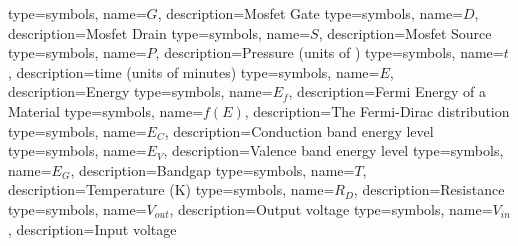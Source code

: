 {
    type=symbols,
    name={\ensuremath{G}},
    description={Mosfet Gate}
}
{
    type=symbols,
    name={\ensuremath{D}},
    description={Mosfet Drain}
}
{
    type=symbols,
    name={\ensuremath{S}},
    description={Mosfet Source}
}
{
    type=symbols,
    name={\ensuremath{P}},
    description={Pressure (units of \si{\torr})}
}
{
    type=symbols,
    name={\ensuremath{t}},
    description={time (units of minutes)}
}
{
    type=symbols,
    name={\ensuremath{E}},
    description={Energy}
}
{
    type=symbols,
    name={\ensuremath{E_{f}}},
    description={Fermi Energy of a Material}
}
{
    type=symbols,
    name={\ensuremath{f(E)}},
    description={The Fermi-Dirac distribution}
}
{
    type=symbols,
    name={\ensuremath{E_{C}}},
    description={Conduction band energy level}
}
{
    type=symbols,
    name={\ensuremath{E_{V}}},
    description={Valence band energy level}
}
{
    type=symbols,
    name={\ensuremath{E_{G}}},
    description={Bandgap}
}
{
    type=symbols,
    name={\ensuremath{T}},
    description={Temperature (\si{\kelvin})}
}
{
    type=symbols,
    name={\ensuremath{R_{D}}},
    description={Resistance}
}
{
    type=symbols,
    name={\ensuremath{V_{out}}},
    description={Output voltage}
}
{
    type=symbols,
    name={\ensuremath{V_{in}}},
    description={Input voltage}
}
